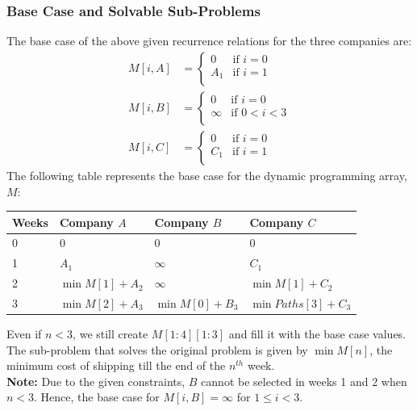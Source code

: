 \documentclass[12pt]{report}
\begin{document}
    \subsubsection*{Base Case and Solvable Sub-Problems}
    The base case of the above given recurrence relations for the three companies are:
    \begin{align}
        M[i, A] &= \begin{cases}
            0 & \text{if } i = 0 \\
            A_{1} & \text{if } i = 1 \\
        \end{cases} \\
        M[i, B] &= \begin{cases}
            0 & \text{if } i = 0 \\
            \infty & \text{if } 0 < i < 3 \\
        \end{cases} \\
        M[i, C] &= \begin{cases}
            0 & \text{if } i = 0 \\
            C_{1} & \text{if } i = 1 \\
        \end{cases}
    \end{align}
    The following table represents the base case for the dynamic programming array, $M$:

    \begin{center}
        \begin{tabular}{| m{12mm} | m{42mm} | m{42mm} | m{42mm} |}
        \hline
        Weeks & Company $A$ & Company $B$ & Company $C$ \\
        \hline \hline
        0 & 0 & 0 & 0 \\
        \hline
        1 & $A_{1}$ & $\infty$ & $C_{1}$ \\
        \hline
        2 & $\min{M[1]} + A_{2}$ & $\infty$ & $\min{M[1]} + C_{2}$ \\
        \hline
        3 & $\min{M[2]} + A_{3}$ & $\min{M[0]} + B_{3}$ & $\min{Paths[3]} + C_{3}$ \\
        \hline
        \end{tabular}
    \end{center}
    Even if $n < 3$, we still create $M[1:4][1:3]$ and fill it with the base case values. \\
    The sub-problem that solves the original problem is given by $\min{M[n]}$, the minimum cost of
    shipping till the end of the $n^{th}$ week.
    \vspace*{5pt} \\
    \textbf{Note:}
    Due to the given constraints, $B$ cannot be selected in weeks 1 and 2 when $n < 3$.
    Hence, the base case for $M[i, B] = \infty$ for $1 \le i < 3$.
\end{document}
